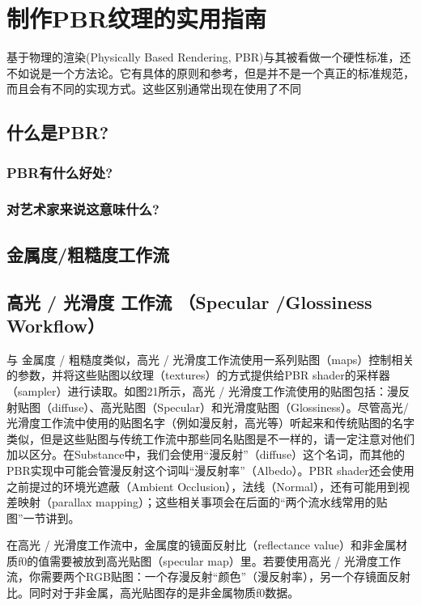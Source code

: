 \chapter{制作PBR纹理的实用指南}

基于物理的渲染(Physically Based Rendering, PBR)与其被看做一个硬性标准，还不如说是一个方法论。它有具体的原则和参考，但是并不是一个真正的标准规范，而且会有不同的实现方式。这些区别通常出现在使用了不同

\section{什么是PBR?}

\subsection{PBR有什么好处?}

\subsection{对艺术家来说这意味什么?}

\section{金属度/粗糙度工作流}



\section{高光 / 光滑度 工作流 （Specular /Glossiness Workflow）}

与 金属度 / 粗糙度类似，高光 / 光滑度工作流使用一系列贴图（maps）控制相关的参数，并将这些贴图以纹理（textures）的方式提供给PBR shader的采样器（sampler）进行读取。如图21所示，高光 / 光滑度工作流使用的贴图包括：漫反射贴图（diffuse）、高光贴图（Specular）和光滑度贴图（Glossiness）。尽管高光/光滑度工作流中使用的贴图名字（例如漫反射，高光等）听起来和传统贴图的名字类似，但是这些贴图与传统工作流中那些同名贴图是不一样的，请一定注意对他们加以区分。在Substance中，我们会使用“漫反射”（diffuse）这个名词，而其他的PBR实现中可能会管漫反射这个词叫“漫反射率”（Albedo）。PBR shader还会使用之前提过的环境光遮蔽（Ambient Occlusion），法线（Normal），还有可能用到视差映射（parallax mapping）；这些相关事项会在后面的“两个流水线常用的贴图”一节讲到。

在高光 / 光滑度工作流中，金属度的镜面反射比（reflectance value）和非金属材质f0的值需要被放到高光贴图（specular map）里。若要使用高光 / 光滑度工作流，你需要两个RGB贴图：一个存漫反射“颜色”（漫反射率），另一个存镜面反射比。同时对于非金属，高光贴图存的是非金属物质f0数据。

